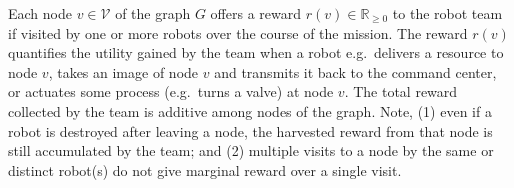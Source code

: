 \documentclass[fleqn,10pt,lineno]{wlpeerj}
\begin{document}



Each node $v\in \mathcal{V}$ of the graph $G$ offers a reward $r(v) \in  \mathbb{R}_{\geq 0}$ to the robot team if visited by one or more robots over the course of the mission.
The reward $r(v)$ quantifies the utility gained by the team when a robot e.g.\ delivers a resource to node $v$, takes an image of node $v$ and transmits it back to the command center, or actuates some process (e.g.\ turns a valve) at node $v$. 
The total reward collected by the team is additive among nodes of the graph. %
Note, 
(1) even if a robot is destroyed after leaving a node, the harvested reward from that node is still accumulated by the team; and
(2) multiple visits to a node by the same or distinct robot(s) do not give marginal reward over a single visit. %




\end{document}
